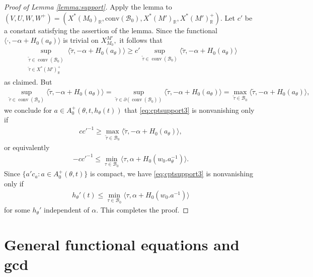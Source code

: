 \documentclass[10pt]{amsart}
\theoremstyle{definition}
\numberwithin{equation}{section}
\numberwithin{equation}{subsection}
\newcommand{\RR}{\mathbb{R}}
\newcommand{\calB}{\mathcal{B}}
\begin{document}
\begin{proof}[Proof of Lemma \ref{lemma:support}]
Apply the lemma to $(V,U,W,W^+) = (X^*(M_0)_\RR,\mathrm{conv}(\mathcal{B}_0),X^*(M')_\RR,X^*(M')^+_\RR).$ Let $c'$ be a constant satisfying the assertion of the lemma. Since the functional $\langle\cdot,-\alpha+H_0(a_\theta)\rangle$ is trivial on $X_{M_0}^{M'},$ it follows that
\begin{align*}
     \sup_{\substack{\tilde{\tau}\in\mathop{\mathrm{conv}}(\mathcal{B}_0)\\\tilde{\tau}\in X^*(M')^+_\mathbb{R}}}\langle \tilde{\tau},-\alpha+H_0(a_\theta)\rangle\ge c'\sup_{\tilde{\tau}\in\mathop{\mathrm{conv}}(\mathcal{B}_0)}\langle \tilde{\tau},-\alpha+H_0(a_\theta)\rangle
\end{align*}
as claimed. But 
\begin{align*}
    \sup_{\tilde{\tau}\in\mathop{\mathrm{conv}}(\mathcal{B}_0)}\langle \tilde{\tau},-\alpha+H_0(a_\theta)\rangle =  \sup_{\tilde{\tau}\in\partial(\mathop{\mathrm{conv}}(\mathcal{B}_0))}\langle \tilde{\tau},-\alpha+H_0(a_\theta)\rangle = \max_{\tilde{\tau}\in\mathcal{B}_0}\langle \tilde{\tau},-\alpha+H_0(a_\theta)\rangle, 
\end{align*}
we conclude for $a\in A_0^+(\theta,t,h_
\theta(t))$ that \eqref{eq:cptsupport3} is nonvanishing only if 
\begin{align*}
    cc'^{-1}\geq \max_{\tilde{\tau}\in\mathcal{B}_0}\langle \tilde{\tau},-\alpha+H_0(a_\theta)\rangle,
\end{align*}
or equivalently
\begin{align*}
    -cc'^{-1}\le  \min_{\tau\in \calB_0} \langle \tau,\alpha+H_0( w_0.a_\theta^{-1})\rangle.
\end{align*}
Since $\{ a'c_a:a\in A_0^+(\theta,t)\}$ is compact, we have \eqref{eq:cptsupport3} is nonvanishing only if
\begin{align*}
    h_{\theta}'(t)\le\min_{\tau\in \calB_0} \langle \tau,\alpha+H_0( w_0.a^{-1})\rangle
\end{align*}
for some $h_{\theta}'$ independent of $\alpha$. This completes the proof.
\end{proof}



\section{General functional equations and gcd}\label{sec:FunctEq}
\end{document}
